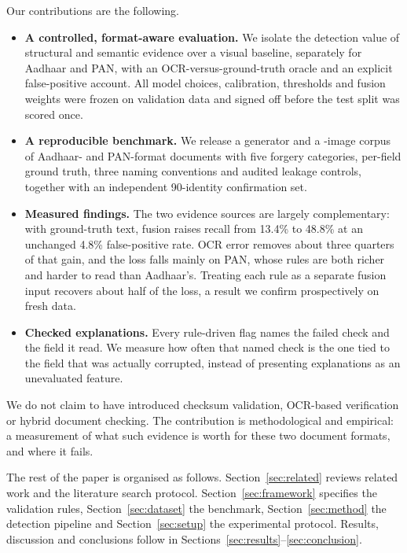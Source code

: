 \documentclass[VANCOUVER,Times1COL]{WileyNJDv5}
\begin{document}
Our contributions are the following.
\begin{itemize}
\item \textbf{A controlled, format-aware evaluation.} We isolate the
detection value of structural and semantic evidence over a visual
baseline, separately for Aadhaar and PAN, with an OCR-versus-ground-truth
oracle and an explicit false-positive account. All model choices,
calibration, thresholds and fusion weights were frozen on validation
data and signed off before the test split was scored once.
\item \textbf{A reproducible benchmark.} We release a generator and a
\dsImages{}-image corpus of Aadhaar- and PAN-format documents with five
forgery categories, per-field ground truth, three naming conventions and
audited leakage controls, together with an independent 90-identity
confirmation set.
\item \textbf{Measured findings.} The two evidence sources are largely
complementary: with ground-truth text, fusion raises recall
from 13.4\% to 48.8\% at an unchanged 4.8\% false-positive rate. OCR
error removes about three quarters of that gain, and the loss falls mainly on
PAN, whose rules are both richer and harder to read than Aadhaar's.
Treating each rule as a separate fusion input recovers about half of
the loss, a result we confirm prospectively on fresh data.
\item \textbf{Checked explanations.} Every rule-driven flag names the
failed check and the field it read. We measure how often that named
check is the one tied to the field that was actually corrupted, instead
of presenting explanations as an unevaluated feature.
\end{itemize}

We do not claim to have introduced checksum validation, OCR-based
verification or hybrid document checking. The contribution is
methodological and empirical: a measurement of what such
evidence is worth for these two document formats, and where it fails.

The rest of the paper is organised as follows. Section~\ref{sec:related}
reviews related work and the literature search protocol. Section~\ref{sec:framework} specifies the
validation rules, Section~\ref{sec:dataset} the benchmark,
Section~\ref{sec:method} the detection pipeline and
Section~\ref{sec:setup} the experimental protocol. Results, discussion
and conclusions follow in Sections~\ref{sec:results}--\ref{sec:conclusion}.

\end{document}
